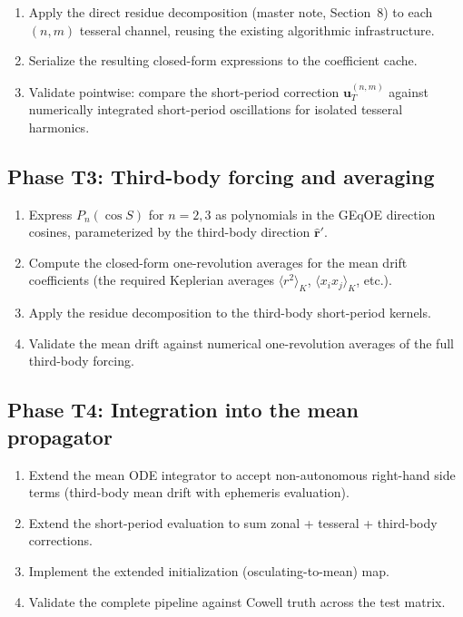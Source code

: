 \documentclass[11pt]{article}
\newcommand{\mean}[1]{\langle #1 \rangle}
\begin{document}
\begin{enumerate}
\item Apply the direct residue decomposition (master note, Section~8) to
each $(n,m)$ tesseral channel, reusing the existing algorithmic
infrastructure.

\item Serialize the resulting closed-form expressions to the coefficient
cache.

\item Validate pointwise: compare the short-period correction
$\bm u_T^{(n,m)}$ against numerically integrated short-period
oscillations for isolated tesseral harmonics.
\end{enumerate}

\subsection{Phase T3: Third-body forcing and averaging}

\begin{enumerate}
\item Express $P_n(\cos S)$ for $n = 2, 3$ as polynomials in the GEqOE
direction cosines, parameterized by the third-body direction
$\hat{\bm r}'$.

\item Compute the closed-form one-revolution averages for the mean drift
coefficients (the required Keplerian averages $\mean{r^2}_K$,
$\mean{x_i x_j}_K$, etc.).

\item Apply the residue decomposition to the third-body short-period
kernels.

\item Validate the mean drift against numerical one-revolution averages
of the full third-body forcing.
\end{enumerate}

\subsection{Phase T4: Integration into the mean propagator}

\begin{enumerate}
\item Extend the mean ODE integrator to accept non-autonomous right-hand
side terms (third-body mean drift with ephemeris evaluation).

\item Extend the short-period evaluation to sum zonal + tesseral +
third-body corrections.

\item Implement the extended initialization (osculating-to-mean) map.

\item Validate the complete pipeline against Cowell truth across the test
matrix.
\end{enumerate}
\end{document}
